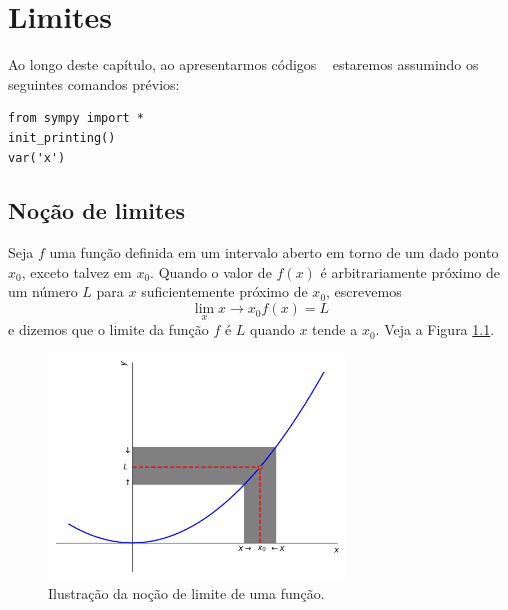 
\chapter{Limites}\label{cap_lim}
\thispagestyle{fancy}

\ifispython
\begin{obs}\label{obs:cap_lim_python}
Ao longo deste capítulo, ao apresentarmos códigos \python~ estaremos assumindo os seguintes comandos prévios:
\begin{verbatim}
from sympy import *
init_printing()
var('x')
\end{verbatim}
\end{obs}
\fi

\section{Noção de limites}\label{cap_lim_sec_lim}

Seja $f$ uma função definida em um intervalo aberto em torno de um dado ponto $x_0$, exceto talvez em $x_0$. Quando o valor de $f(x)$ é arbitrariamente próximo de um número $L$ para $x$ suficientemente próximo de $x_0$, escrevemos
\begin{equation}
  \lim_x{x\to x_0} f(x) = L
\end{equation}
e dizemos que o limite da função $f$ é $L$ quando $x$ tende a $x_0$. Veja a Figura \ref{fig:lim}.

\begin{figure}[H]
  \centering
  \includegraphics[width=0.7\textwidth]{./cap_lim/dados/fig_lim/fig_lim}
  \caption{Ilustração da noção de limite de uma função.}
  \label{fig:lim}
\end{figure}

